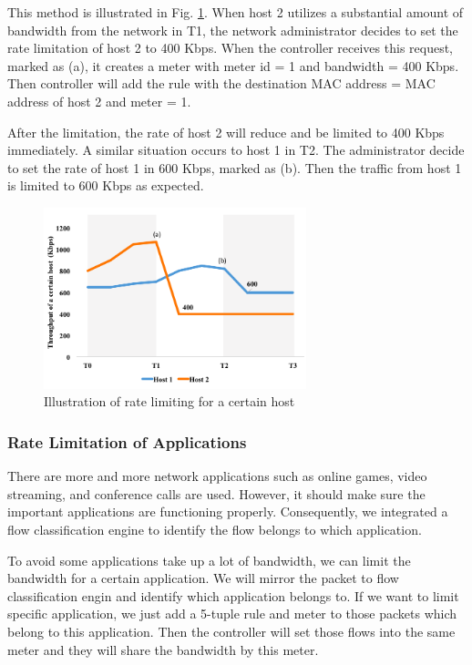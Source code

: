 \documentclass[conference]{IEEEtran}
\begin{document}
This method is illustrated in Fig. \ref{fig:mft_qos_rate_host}.
When host 2 utilizes a substantial amount of bandwidth from the network in T1, the network administrator decides to set the rate limitation of host 2 to 400 Kbps.
When the controller receives this request, marked as (a), it creates a meter with meter id = 1 and bandwidth = 400 Kbps.
Then controller will add the rule with the destination MAC address = MAC address of host 2 and meter = 1.

After the limitation, the rate of host 2 will reduce and be limited to 400 Kbps immediately.
A similar situation occurs to host 1 in T2.
The administrator decide to set the rate of host 1 in 600 Kbps, marked as (b).
Then the traffic from host 1 is limited to 600 Kbps as expected.

\begin{figure}[!t]
\centering
\includegraphics[width=3in]{./figures/mft_qos_rate_host}
\caption{Illustration of rate limiting for a certain host}
\label{fig:mft_qos_rate_host}
\end{figure}

\subsubsection{Rate Limitation of Applications}

There are more and more network applications such as online games, video streaming, and conference calls are used.
However, it should make sure the important applications are functioning properly.
Consequently, we integrated a flow classification engine to identify the flow belongs to which application.

To avoid some applications take up a lot of bandwidth, we can limit the bandwidth for a certain application.
We will mirror the packet to flow classification engin and identify which application belongs to.
If we want to limit specific application, we just add a 5-tuple rule and meter to those packets which belong to this application.
Then the controller will set those flows into the same meter and they will share the bandwidth by this meter.
\end{document}
